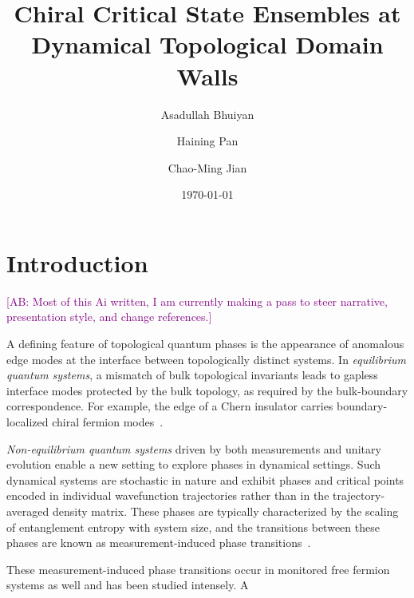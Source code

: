 \documentclass[aps,prb,twocolumn,superscriptaddress,longbibliography]{revtex4-2}
\newcommand{\abcom}[1]{\textcolor{purple}{[AB: #1]}}
\theoremstyle{plain}
\theoremstyle{definition}
\theoremstyle{remark}
\begin{document}
\title{Chiral Critical State Ensembles at Dynamical Topological Domain Walls}

\author{Asadullah Bhuiyan}
\author{Haining Pan}
\author{Chao-Ming Jian}

\date{\today}

\maketitle

\section{Introduction}
\abcom{Most of this Ai written, I am currently making a pass to steer narrative, presentation style, and change references.}

A defining feature of topological quantum phases is the appearance of anomalous edge modes at the interface between topologically distinct systems. 
In \textit{equilibrium quantum systems}, a mismatch of bulk topological invariants leads to gapless interface modes protected by the bulk topology, as required by the bulk-boundary correspondence. For example, the edge of a Chern insulator carries boundary-localized chiral fermion modes~\cite{Hatsugai1993,HasanKane2010,QiZhang2011,Chiu2016}. 

\textit{Non-equilibrium quantum systems} driven by both measurements and unitary evolution enable a new setting to explore phases in dynamical settings. Such dynamical systems are stochastic in nature and exhibit phases and critical points encoded in individual wavefunction trajectories rather than in the trajectory-averaged density matrix. These phases are typically characterized by the scaling of entanglement entropy with system size, and the transitions between these phases are known as measurement-induced phase transitions~\cite{LiChenFisher2018,Skinner2019,GullansHuse2020,Fisher2023}. 

These measurement-induced phase transitions occur in monitored free fermion systems as well and has been studied intensely. A 
\end{document}
